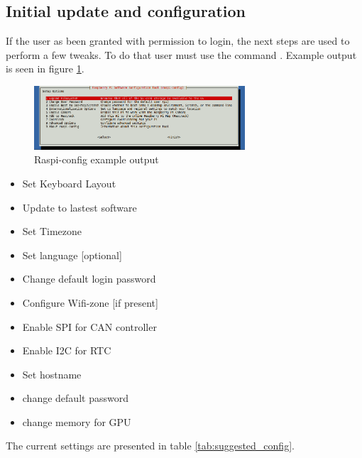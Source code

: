 \subsection{Initial update and configuration}
If the user as been granted with permission to login, the next steps are used to perform a few tweaks.
To do that user must use the command . Example output is seen in figure \ref{fig:raspi_config}.

\begin{figure}[hb]
	\centering
	\includegraphics[width=0.7\textwidth]{figures/raspi-config}
	\caption{Raspi-config example output}
	\label{fig:raspi_config}
\end{figure}

\begin{itemize}
	\tightlist
	\item Set Keyboard Layout
	\item Update to lastest software
	\item Set Timezone
	\item Set language [optional]
	\item Change default login password
	\item Configure Wifi-zone [if present]
	\item Enable \gls{SPI} for CAN controller
	\item Enable \gls{I2C} for RTC
	\item Set hostname
	\item change default password
	\item change memory for GPU
\end{itemize}



The current settings are presented in table \ref{tab:suggested_config}. 

